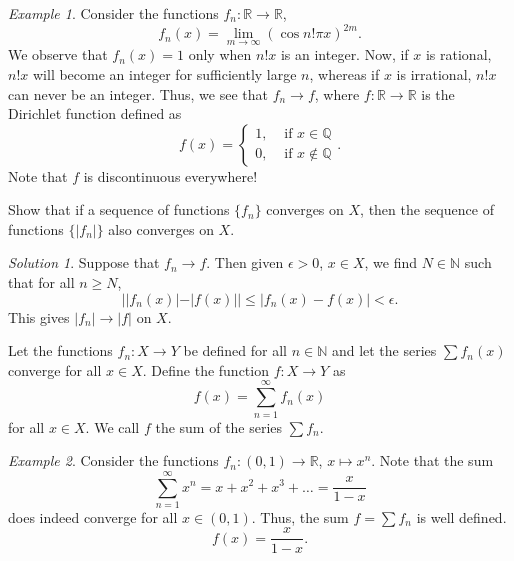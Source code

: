\documentclass[11pt]{article}
\def\R{\mathbb{R}}
\def\Q{\mathbb{Q}}
\def\N{\mathbb{N}}
\theoremstyle{definition}
\theoremstyle{remark}
\newtheorem*{example}{Example}
\newtheorem*{solution}{Solution}
\numberwithin{equation}{module}
\begin{document}
    \begin{example}
        Consider the functions $f_n\colon \R \to \R$, \[
            f_n(x) = \lim_{m \to \infty} (\cos{n!\pi x})^{2m}.
        \] We observe that $f_n(x) = 1$ only when $n!x$ is an integer.
        Now, if $x$ is rational, $n!x$ will become an integer for sufficiently large
        $n$, whereas if $x$ is irrational, $n!x$ can never be an integer. Thus,
        we see that $f_n \to f$, where $f\colon \R \to \R$ is the Dirichlet
        function defined as \[
            f(x) = \begin{cases}
                1, &\text{ if } x \in \Q \\
                0, &\text{ if } x \notin \Q
            \end{cases}.
        \] 
        Note that $f$ is discontinuous everywhere!
    \end{example}

    \begin{exercise}
        Show that if a sequence of functions $\{f_n\}$ converges on $X$, 
        then the sequence of functions $\{|f_n|\}$ also converges on $X$.
        \begin{solution}
            Suppose that $f_n \to f$. Then given $\epsilon > 0$, $x \in X$, we find
            $N \in \N$ such that for all $n \geq N$, \[
                | |f_n(x)| - |f(x)| | \leq |f_n(x) - f(x)| < \epsilon.
            \] This gives $|f_n| \to |f|$ on $X$.
        \end{solution}
    \end{exercise}
    
    \begin{definition}
        Let the functions $f_n\colon X \to Y$ be defined for all $n \in \mathbb{N}$
        and let the series $\sum f_n(x)$ converge for all $x \in X$.
        Define the function $f\colon X \to Y$ as \[
            f(x) = \sum_{n = 1}^\infty f_n(x)
        \] for all $x \in X$. We call $f$ the sum of the series $\sum f_n$.
    \end{definition}
    \begin{example}
        Consider the functions $f_n\colon (0, 1) \to \R$, $x \mapsto x^n$.
        Note that the sum \[
            \sum_{n = 1}^{\infty} x^n = x + x^2 + x^3 + \dots 
                = \frac{x}{1 - x} 
        \] does indeed converge for all $x \in (0, 1)$. Thus, the sum $f = \sum f_n$
        is well defined. \[
            f(x) = \frac{x}{1 - x}.
        \] 
    \end{example}
    
\end{document}
